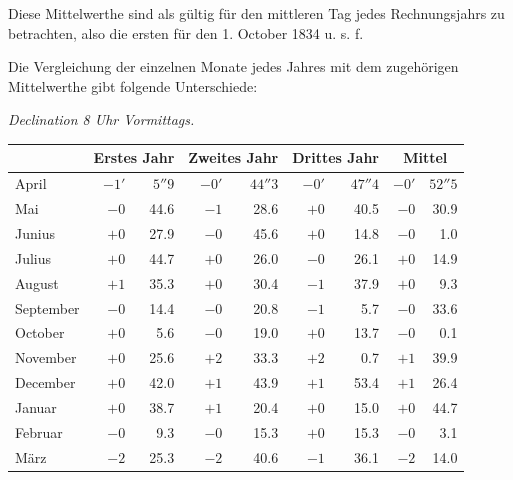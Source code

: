 Diese Mittelwerthe sind als gültig für den mittleren Tag jedes Rechnungsjahrs zu betrachten, also die ersten für den 1. October 1834 u. s. f.

Die Vergleichung der einzelnen Monate jedes Jahres mit dem zugehörigen Mittelwerthe gibt folgende Unterschiede:
\begin{center}\small
\textit{Declination 8 Uhr Vormittags.}\par\smallskip
\begin{tabular}{l|rr|rr|rr||rr}
&\multicolumn{2}{c|}{Erstes Jahr}&\multicolumn{2}{c|}{Zweites Jahr}&\multicolumn{2}{c||}{Drittes Jahr}&\multicolumn{2}{c}{Mittel}\\\hline
April&$-1'$&$5''9$&$-0'$&$44''3$&$-0'$&$47''4$&$-0'$&$52''5$\\
Mai&$-0$&44.6&$-1$&28.6&$+0$&40.5&$-0$&30.9\\
Junius&$+0$&27.9&$-0$&45.6&$+0$&14.8&$-0$&1.0\\
Julius&$+0$&44.7&$+0$&26.0&$-0$&26.1&$+0$&14.9\\
August&$+1$&35.3&$+0$&30.4&$-1$&37.9&$+0$&9.3\\
September&$-0$&14.4&$-0$&20.8&$-1$&5.7&$-0$&33.6\\
October&$+0$&5.6&$-0$&19.0&$+0$&13.7&$-0$&0.1\\
November&$+0$&25.6&$+2$&33.3&$+2$&0.7&$+1$&39.9\\
December&$+0$&42.0&$+1$&43.9&$+1$&53.4&$+1$&26.4\\
Januar&$+0$&38.7&$+1$&20.4&$+0$&15.0&$+0$&44.7\\
Februar&$-0$&9.3&$-0$&15.3&$+0$&15.3&$-0$&3.1\\
März&$-2$&25.3&$-2$&40.6&$-1$&36.1&$-2$&14.0
\end{tabular}
\end{center}
